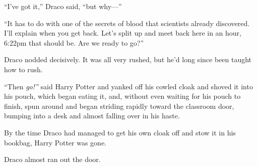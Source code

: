 ``I've got it,'' Draco said, ``but why---''

``It has to do with one of the secrets of blood that scientists already
discovered. I'll explain when you get back. Let's split up and meet back
here in an hour, 6:22pm that should be. Are we ready to go?''

Draco nodded decisively. It was all very rushed, but he'd long since
been taught how to rush.

``Then \emph{go!''} said Harry Potter and yanked off his cowled cloak
and shoved it into his pouch, which began eating it, and, without even
waiting for his pouch to finish, spun around and began striding rapidly
toward the classroom door, bumping into a desk and almost falling over
in his haste.

By the time Draco had managed to get his own cloak off and stow it in
his bookbag, Harry Potter was gone.

Draco almost ran out the door.
